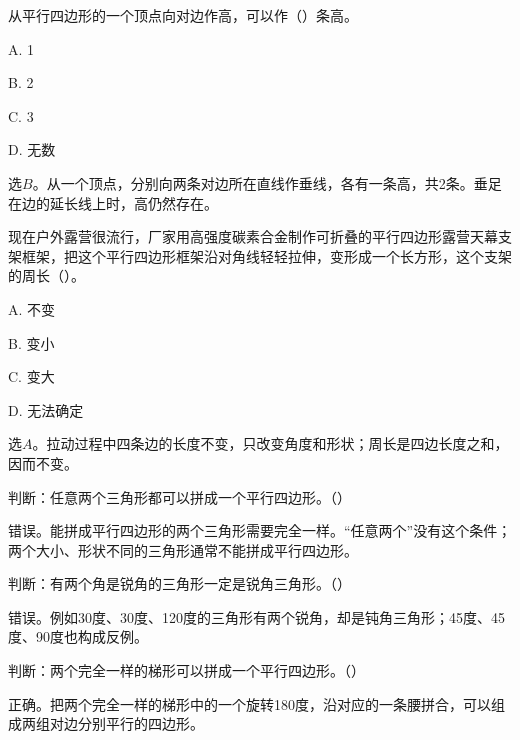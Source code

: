 从平行四边形的一个顶点向对边作高，可以作（\hspace{1.8em}）条高。\par
\noindent A. 1\par
\noindent B. 2\par
\noindent C. 3\par
\noindent D. 无数\par
\begin{BookAnswer}
选\(B\)。从一个顶点，分别向两条对边所在直线作垂线，各有一条高，共2条。垂足在边的延长线上时，高仍然存在。
\end{BookAnswer}

现在户外露营很流行，厂家用高强度碳素合金制作可折叠的平行四边形露营天幕支架框架，把这个平行四边形框架沿对角线轻轻拉伸，变形成一个长方形，这个支架的周长（\hspace{1.8em}）。\par
\noindent A. 不变\par
\noindent B. 变小\par
\noindent C. 变大\par
\noindent D. 无法确定\par
\begin{BookAnswer}
选\(A\)。拉动过程中四条边的长度不变，只改变角度和形状；周长是四边长度之和，因而不变。
\end{BookAnswer}

判断：任意两个三角形都可以拼成一个平行四边形。（\hspace{1.8em}）\par
\begin{BookAnswer}
错误。能拼成平行四边形的两个三角形需要完全一样。“任意两个”没有这个条件；两个大小、形状不同的三角形通常不能拼成平行四边形。
\end{BookAnswer}

判断：有两个角是锐角的三角形一定是锐角三角形。（\hspace{1.8em}）\par
\begin{BookAnswer}
错误。例如30度、30度、120度的三角形有两个锐角，却是钝角三角形；45度、45度、90度也构成反例。
\end{BookAnswer}

判断：两个完全一样的梯形可以拼成一个平行四边形。（\hspace{1.8em}）\par
\begin{BookAnswer}
正确。把两个完全一样的梯形中的一个旋转180度，沿对应的一条腰拼合，可以组成两组对边分别平行的四边形。
\end{BookAnswer}

